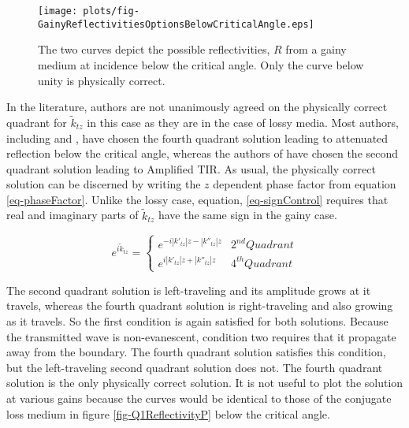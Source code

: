 \documentclass[12pt]{uthesis-v12}
\begin{document}
\begin{figure}[htb]
\centering
  \texttt{[image: plots/fig-GainyReflectivitiesOptionsBelowCriticalAngle.eps]}
\caption[Two possible Reflectivities from gainy medium below critical angle]{The two curves depict the possible reflectivities, $R$ from a gainy medium at incidence below the critical angle. Only the curve below unity is physically correct.\label{fig-GainyReflectivitiesOptionsBelowCriticalAngle}} 
\end{figure}

In the literature, authors are not unanimously agreed on the physically correct quadrant for $\tilde{k}_{tz}$ in this case as they are in the case of lossy media. Most authors, including \cite{Romanov} \cite{Fan} \cite{Willis} and \cite{Mansuripur}, have chosen the fourth quadrant solution leading to attenuated reflection below the critical angle, whereas the authors of \cite{CandC} have chosen the second quadrant solution leading to Amplified TIR. As usual, the physically correct solution can be discerned by writing the $z$ dependent phase factor from equation \ref{eq-phaseFactor}. Unlike the lossy case, equation, \ref{eq-signControl} requires that real and imaginary parts of $\tilde{k}_{tz}$ have the same sign in the gainy case.

\begin{equation}
e^{i\tilde{k}_{tz}} = \begin{cases}
    e^{-i|k'_{tz}|z-|k''_{tz}|z}       & 2^{nd} Quadrant \\
    e^{i|k'_{tz}|z+|k''_{tz}|z}        & 4^{th} Quadrant
\end{cases}
\end{equation}

The second quadrant solution is left-traveling and its amplitude grows at it travels, whereas the fourth quadrant solution is right-traveling and also growing as it travels. So the first condition is again satisfied for both solutions. Because the transmitted wave is non-evanescent, condition two requires that it propagate away from the boundary. The fourth quadrant solution satisfies this condition, but the left-traveling second quadrant solution does not. The fourth quadrant solution is the only physically correct solution. It is not useful to plot the solution at various gains because the curves would be identical to those of the conjugate loss medium in figure \ref{fig-Q1ReflectivityP} below the critical angle.
\end{document}
